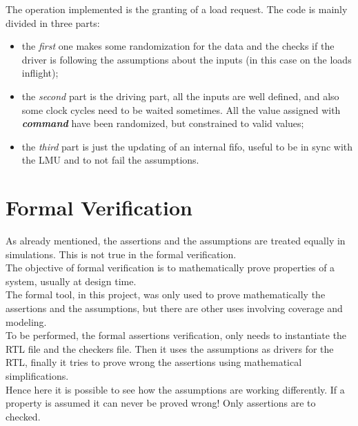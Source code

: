 The operation implemented is the granting of a load request. The code is mainly divided in three parts: 
\begin{itemize}
    \item the \emph{first} one makes some randomization for the data and the checks if the driver is following the assumptions about the inputs (in this case on the loads inflight);
    
    \item the \emph{second} part is the driving part, all the inputs are well defined, and also some clock cycles need to be waited sometimes. All the value assigned with \textbf{\emph{command}} have been randomized, but constrained to valid values;
    
    \item the \emph{third} part is just the updating of an internal fifo, useful to be in sync with the LMU and to not fail the assumptions.
\end{itemize}  
\bigskip






\section{Formal Verification}
As already mentioned, the assertions and the assumptions are treated equally in simulations. This is not true in the formal verification.\\

The objective of formal veriﬁcation is to mathematically prove properties of a system, usually at design time\cite{verification-book-2018-formal}.\\
The formal tool, in this project, was only used to prove mathematically the assertions and the assumptions, but there are other uses involving coverage and modeling.\\

To be performed, the formal assertions verification, only needs to instantiate the RTL file and the checkers file. Then it uses the assumptions as drivers for the RTL, finally it tries to prove wrong the assertions using mathematical simplifications.\\

Hence here it is possible to see how the assumptions are working differently. If a property is assumed it can never be proved wrong! Only assertions are to checked.\\

